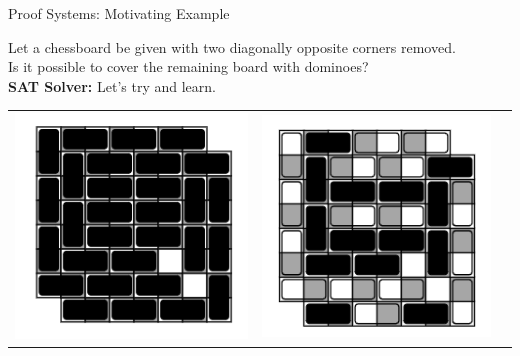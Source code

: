 \documentclass[t]{sdqbeamer}
\begin{document}
\begin{frame}{Proof Systems: Motivating Example}
\begin{example}
Let a chessboard be given with two diagonally opposite corners removed.\\
Is it possible to cover the remaining board with dominoes?\\[1ex]
\textbf{SAT Solver:} Let's try and learn.\\
\begin{tabularx}{\linewidth}{XXX}
    \includegraphics[width=.8\linewidth]{figures/l12/mcb1.png} &
    \includegraphics[width=.8\linewidth]{figures/l12/mcb2.png} &

\end{tabularx}
\end{example}
\end{frame}
\end{document}
